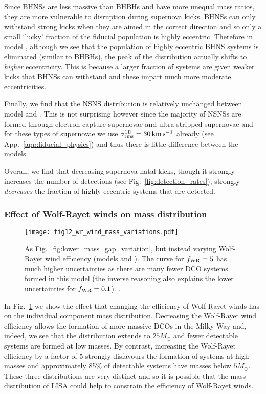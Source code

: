 Since BHNSs are less massive than BHBHs and have more unequal mass ratios, they are more vulnerable to disruption during supernova kicks. BHNSs can only withstand strong kicks when they are aimed in the correct direction and so only a small `lucky' fraction of the fiducial population is highly eccentric. Therefore in model \modSigLower{}, although we see that the population of highly eccentric BHNS systems is eliminated (similar to BHBHs), the peak of the distribution actually shifts to \textit{higher} eccentricity. This is because a larger fraction of systems are given weaker kicks that BHNSs can withstand and these impart much more moderate eccentricities.

Finally, we find that the NSNS distribution is relatively unchanged between model \modFid{} and \modSigLower{}. This is not surprising however since the majority of NSNSs are formed through electron-capture supernovae and ultra-stripped supernovae and for these types of supernovae we use $\sigma^{\rm 1D}_{\rm rms} = 30 \unit{km}{s^{-1}}$ already (see App.~\ref{app:fiducial_physics}) and thus there is little difference between the models.

Overall, we find that decreasing supernova natal kicks, though it strongly increases the number of detections (see Fig.~\ref{fig:detection_rates}), strongly \textit{decreases} the fraction of highly eccentric systems that are detected.

\subsubsection{Effect of Wolf-Rayet winds on mass distribution}

\begin{figure}[tb]
    \centering
    \texttt{[image: fig12\_wr\_wind\_mass\_variations.pdf]}
    \caption{As Fig.~\ref{fig:lower_mass_gap_variation}, but instead varying Wolf-Rayet wind efficiency (models \modWRLow{} and \modWRHigh{}). The curve for $f_{\rm WR} = 5$ has much higher uncertainties as there are many fewer DCO systems formed in this model (the inverse reasoning also explains the lower uncertainties for $f_{\rm WR} = 0.1$). \href{https://github.com/TomWagg/detecting-DCOs-in-LISA/blob/main/paper/figures/fig12_wr_wind_mass_variations.pdf}{\faFileImage} \href{https://github.com/TomWagg/detecting-DCOs-in-LISA/blob/main/paper/figure_notebooks/variations.ipynb}{\faBook}.}
    \label{fig:wr_wind_mass_variations}
\end{figure}

In Fig.~\ref{fig:wr_wind_mass_variations} we show the effect that changing the efficiency of Wolf-Rayet winds has on the individual component mass distribution. Decreasing the Wolf-Rayet wind efficiency allows the formation of more massive DCOs in the Milky Way and, indeed, we see that the distribution extends to $25 \unit{M_{\odot}}$ and fewer detectable systems are formed at low masses. By contrast, increasing the Wolf-Rayet efficiency by a factor of 5 strongly disfavours the formation of systems at high masses and approximately 85\% of detectable systems have masses below $5 \unit{M_{\odot}}$. These three distributions are very distinct and so it is possible that the mass distribution of LISA could help to constrain the efficiency of Wolf-Rayet winds.
